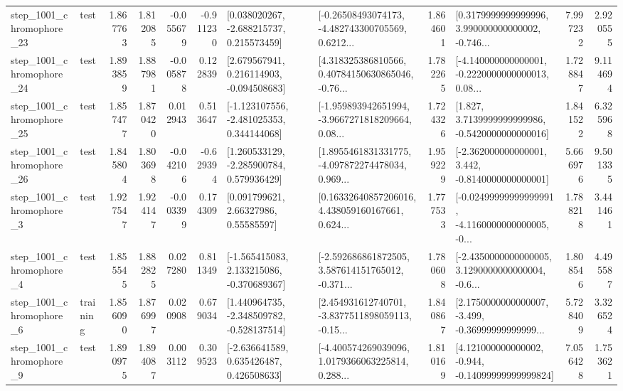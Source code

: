 \begin{tabular}{llrrrrllrlrr}
 step\_1001\_chromophore\_23 &      test &      1.867763 &    1.812085 &     -0.055679 & -0.911230 &    [0.038020267, -2.688215737, 0.215573459] &  [-0.26508493074173, -4.482743300705569, 0.6212... &       1.864601 &  [0.3179999999999996, 3.990000000000002, -0.746... &            7.997232 &          2.920555 \\
 step\_1001\_chromophore\_24 &      test &      1.893859 &    1.887981 &     -0.005878 &  0.122839 &    [2.679567941, 0.216114903, -0.094508683] &  [4.318325386810566, 0.40784150630865046, -0.76... &       1.782265 &  [-4.140000000000001, -0.2220000000000013, 0.08... &            1.728847 &          9.114694 \\
 step\_1001\_chromophore\_25 &      test &      1.857477 &    1.870420 &      0.012943 &  0.513647 &   [-1.123107556, -2.481025353, 0.344144068] &  [-1.959893942651994, -3.9667271818209664, 0.08... &       1.724326 &   [1.827, 3.7139999999999986, -0.5420000000000016] &            1.841522 &          6.325968 \\
 step\_1001\_chromophore\_26 &      test &      1.845804 &    1.803698 &     -0.042106 & -0.629394 &    [1.260533129, -2.285900784, 0.579936429] &  [1.8955461831331775, -4.097872274478034, 0.969... &       1.959229 &   [-2.362000000000001, 3.442, -0.8140000000000001] &            5.666976 &          9.501335 \\
  step\_1001\_chromophore\_3 &      test &      1.927547 &    1.924147 &     -0.003399 &  0.174309 &       [0.091799621, 2.66327986, 0.55585597] &  [0.16332640857206016, 4.438059160167661, 0.624... &       1.777533 &  [-0.02499999999999991, -4.1160000000000005, -0... &            1.788218 &          3.441461 \\
  step\_1001\_chromophore\_4 &      test &      1.855545 &    1.882825 &      0.027280 &  0.811349 &   [-1.565415083, 2.133215086, -0.370689367] &  [-2.592686861872505, 3.587614151765012, -0.371... &       1.780608 &  [-2.4350000000000005, 3.1290000000000004, -0.6... &            1.808546 &          4.495587 \\
  step\_1001\_chromophore\_6 &  training &      1.856090 &    1.876997 &      0.020908 &  0.679034 &   [1.440964735, -2.348509782, -0.528137514] &  [2.454931612740701, -3.8377511898059113, -0.15... &       1.840867 &  [2.1750000000000007, -3.499, -0.36999999999999... &            5.728409 &          3.326524 \\
  step\_1001\_chromophore\_9 &      test &      1.890975 &    1.894087 &      0.003112 &  0.309523 &    [-2.636641589, 0.635426487, 0.426508633] &  [-4.400574269039096, 1.0179366063225814, 0.288... &       1.810169 &  [4.121000000000002, -0.944, -0.14099999999999824] &            7.056428 &          1.753621 \\

\end{tabular}
